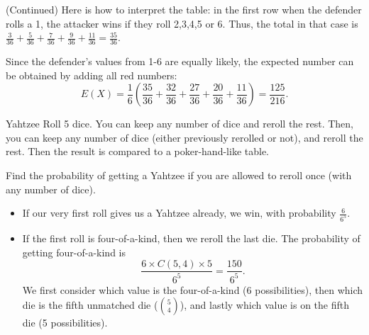 \begin{frame}
\begin{sol} (Continued)
Here is how to interpret the table: in the first row when the defender rolls a 1, the attacker wins if they roll 2,3,4,5 or 6. Thus, the total in that case is $\frac{3}{36} + \frac{5}{36} + \frac{7}{36} + \frac{9}{36} + \frac{11}{36} = \frac{35}{36}$. 

\begin{figure}[h!]
\centering
{}
\end{figure}

Since the defender's values from 1-6 are equally likely, the expected number can be obtained by adding all red numbers:
\[ E(X) = \frac{1}{6}\left(\frac{35}{36} + \frac{32}{36} + \frac{27}{36} + \frac{20}{36} + \frac{11}{36}\right) = \frac{125}{216}.\]
\end{sol}
\end{frame}

\begin{frame}{Yahtzee}
Roll 5 dice. You can keep any number of dice and reroll the rest. Then, you can keep any number of dice (either previously rerolled or not), and reroll the rest. Then the result is compared to a poker-hand-like table.
\end{frame}

\begin{frame}{}
\end{frame}

\begin{frame}[t]
\begin{ex}
Find the probability of getting a Yahtzee if you are allowed to reroll once (with any number of dice).
\end{ex}
\begin{sol}
\begin{itemize}
\item If our very first roll gives us a Yahtzee already, we win, with probability $\frac{6}{6^5}$.
\item If the first roll is four-of-a-kind, then we reroll the last die. The probability of getting four-of-a-kind is 
\[\frac{6 \times C(5,4) \times 5}{6^5} = \frac{150}{6^5}.\] 
We first consider which value is the four-of-a-kind (6 possibilities), then which die is the fifth unmatched die ($\binom{5}{4}$), and lastly which value is on the fifth die (5 possibilities).
\end{itemize}
\end{sol}
\end{frame}

